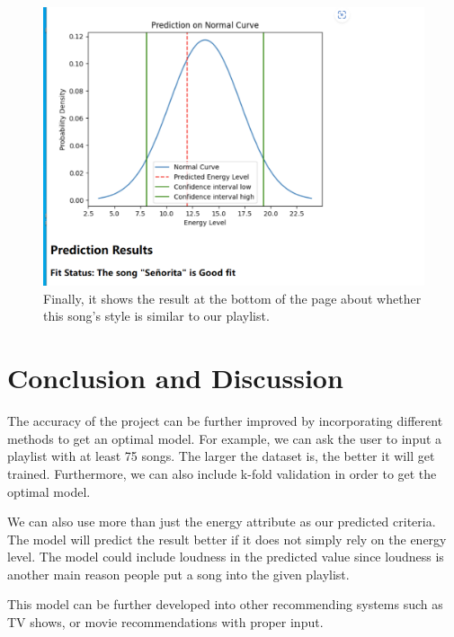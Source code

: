 \documentclass[titlepage]{article}
\begin{document}
\begin{figure}[h]
\centering
\includegraphics[width=1\textwidth]{5.png}
\caption{Finally, it shows the result at the bottom of the page about whether this song's style is similar to our playlist.}
\label{fig:enter-label}
\end{figure}
\clearpage

\section{Conclusion and Discussion}
The accuracy of the project can be further improved by incorporating different methods to get an optimal model. For example, we can
ask the user to input a playlist with at least 75 songs. The larger the dataset is, the better it will get trained. Furthermore, we
can also include k-fold validation in order to get the optimal model. 

We can also use more than just the energy attribute as our predicted criteria. The model will predict the result better if it does not
simply rely on the energy level. The model could include loudness in the predicted value since loudness is another main reason people
put a song into the given playlist.

This model can be further developed into other recommending systems such as TV shows, or movie recommendations with proper input. 
\end{document}
